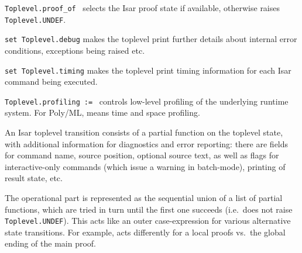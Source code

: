 \begin{isabellebody}
\begin{isamarkuptext}
\begin{description}
  \item \verb|Toplevel.proof_of|~ selects the Isar proof
  state if available, otherwise raises \verb|Toplevel.UNDEF|.

  \item \verb|set Toplevel.debug| makes the toplevel print further
  details about internal error conditions, exceptions being raised
  etc.

  \item \verb|set Toplevel.timing| makes the toplevel print timing
  information for each Isar command being executed.

  \item \verb|Toplevel.profiling|~\verb|:=|~ controls
  low-level profiling of the underlying {\ML} runtime system.  For
  Poly/ML,  means time and  space
  profiling.

  \end{description}%
\end{isamarkuptext}%
\isamarkuptrue%
%
\endisatagmlref
{\isafoldmlref}%
%
\isadelimmlref
%
\endisadelimmlref
%
\isamarkuptrue%
%
\begin{isamarkuptext}%
An Isar toplevel transition consists of a partial function on the
  toplevel state, with additional information for diagnostics and
  error reporting: there are fields for command name, source position,
  optional source text, as well as flags for interactive-only commands
  (which issue a warning in batch-mode), printing of result state,
  etc.

  The operational part is represented as the sequential union of a
  list of partial functions, which are tried in turn until the first
  one succeeds (i.e.\ does not raise \verb|Toplevel.UNDEF|).  This acts
  like an outer case-expression for various alternative state
  transitions.  For example,  acts differently for a
  local proofs vs.\ the global ending of the main proof.


\end{isamarkuptext}
\end{isabellebody}
